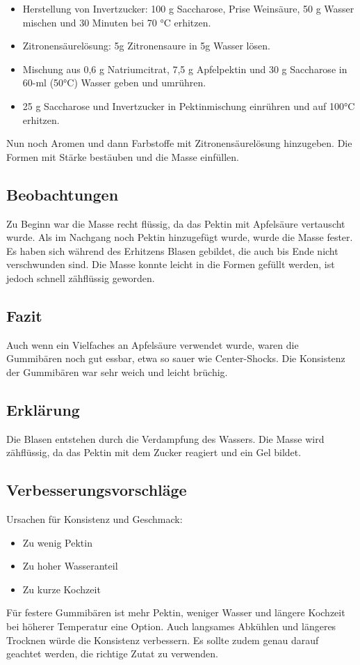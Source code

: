 \documentclass{article}
\begin{document}
    \begin{itemize}
        \item Herstellung von Invertzucker: 100 g Saccharose, Prise Weinsäure, 50 g Wasser mischen und 30 Minuten bei 70 °C erhitzen.
        \item Zitronensäurelösung: 5g Zitronensaure in 5g Wasser lösen.
        \item Mischung aus 0,6 g Natriumcitrat, 7,5 g Apfelpektin und 30 g Saccharose in 60-ml (50°C) Wasser geben und umrühren.
        \item 25 g Saccharose und Invertzucker in Pektinmischung einrühren und auf 100°C erhitzen.
    \end{itemize}
    Nun noch Aromen und dann Farbstoffe mit Zitronensäurelösung hinzugeben.
    Die Formen mit Stärke bestäuben und die Masse einfüllen.

    \subsection{Beobachtungen}
    Zu Beginn war die Masse recht flüssig, da das Pektin mit Apfelsäure vertauscht wurde.
    Als im Nachgang noch Pektin hinzugefügt wurde, wurde die Masse fester.
    Es haben sich während des Erhitzens Blasen gebildet, die auch bis Ende nicht verschwunden sind.
    Die Masse konnte leicht in die Formen gefüllt werden, ist jedoch schnell zähflüssig geworden.

    \subsection{Fazit}
    Auch wenn ein Vielfaches an Apfelsäure verwendet wurde, waren die Gummibären noch gut essbar,
    etwa so sauer wie Center-Shocks.
    Die Konsistenz der Gummibären war sehr weich und leicht brüchig.

    \subsection{Erklärung}
    Die Blasen entstehen durch die Verdampfung des Wassers.
    Die Masse wird zähflüssig, da das Pektin mit dem Zucker reagiert und ein Gel bildet.

    \subsection{Verbesserungsvorschläge}
    Ursachen für Konsistenz und Geschmack:

    \begin{itemize}
        \item Zu wenig Pektin
        \item Zu hoher Wasseranteil
        \item Zu kurze Kochzeit
    \end{itemize}
    Für festere Gummibären ist mehr Pektin, weniger Wasser und längere Kochzeit bei höherer Temperatur eine Option.
    Auch langsames Abkühlen und längeres Trocknen würde die Konsistenz verbessern.
    Es sollte zudem genau darauf geachtet werden, die richtige Zutat zu verwenden.
\end{document}
